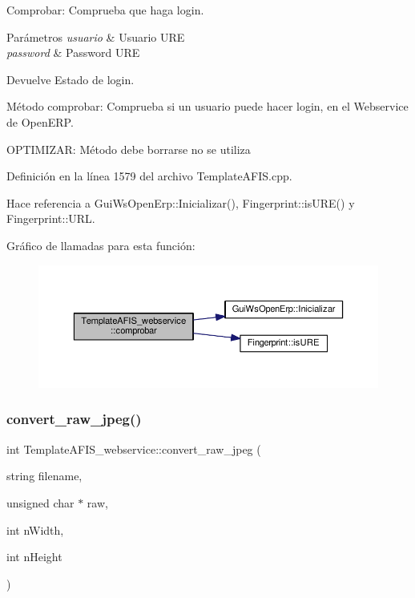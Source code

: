 Comprobar\+: Comprueba que haga login. 


\begin{DoxyParams}{Parámetros}
{\em usuario} & Usuario U\+RE \\
\hline
{\em password} & Password U\+RE \\
\hline
\end{DoxyParams}
\begin{DoxyReturn}{Devuelve}
Estado de login.
\end{DoxyReturn}
Método comprobar\+: Comprueba si un usuario puede hacer login, en el Webservice de Open\+E\+RP.

O\+P\+T\+I\+M\+I\+Z\+AR\+: Método debe borrarse no se utiliza 

Definición en la línea 1579 del archivo Template\+A\+F\+I\+S.\+cpp.



Hace referencia a Gui\+Ws\+Open\+Erp\+::\+Inicializar(), Fingerprint\+::is\+U\+R\+E() y Fingerprint\+::\+U\+RL.

Gráfico de llamadas para esta función\+:\nopagebreak
\begin{figure}[H]
\begin{center}
\leavevmode
\includegraphics[width=350pt]{classTemplateAFIS__webservice_a5491ba1e8737a0adea2527fcbbc428af_cgraph}
\end{center}
\end{figure}
\hypertarget{classTemplateAFIS__webservice_a32fefd35ad3d702984aa442f4407515d}{}\label{classTemplateAFIS__webservice_a32fefd35ad3d702984aa442f4407515d} 
\subsubsection{\texorpdfstring{convert\+\_\+raw\+\_\+jpeg()}{convert\_raw\_jpeg()}}
{\footnotesize\ttfamily int Template\+A\+F\+I\+S\+\_\+webservice\+::convert\+\_\+raw\+\_\+jpeg (\begin{DoxyParamCaption}\item[{string}]{filename,  }\item[{unsigned char $\ast$}]{raw,  }\item[{int}]{n\+Width,  }\item[{int}]{n\+Height }\end{DoxyParamCaption})\hspace{0.3cm}{\ttfamily [private]}}



